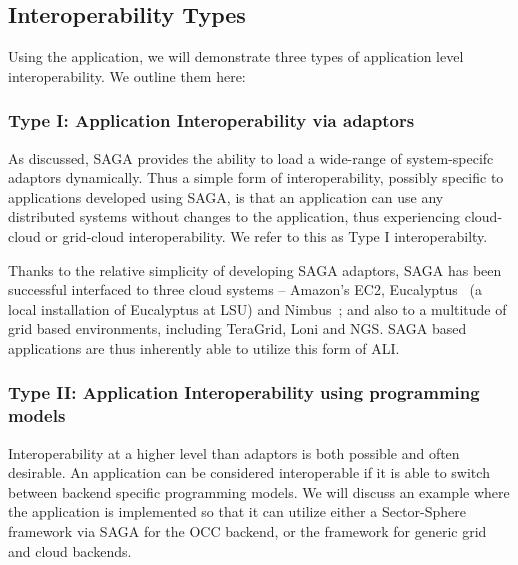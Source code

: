 \documentclass[graybox]{svmult}
\begin{document}
\subsection{Interoperability Types}

Using the \wc application, we will demonstrate three types of
application level interoperability. We outline them here:


\subsubsection{Type I: Application Interoperability via adaptors}
%
%

As discussed, SAGA provides the ability to load a wide-range of
system-specifc adaptors dynamically. Thus a simple form of
interoperability, possibly specific to applications developed using
SAGA, is that an application can use any distributed systems without
changes to the application, thus experiencing cloud-cloud or
grid-cloud interoperability.  We refer to this as Type I
interoperabilty.


Thanks to the relative simplicity of developing SAGA adaptors, SAGA
has been successful interfaced to three cloud systems -- Amazon's EC2,
Eucalyptus~\cite{eucalyptus} (a local installation of Eucalyptus at
LSU) and Nimbus~\cite{nimbus}; and also to a multitude of grid based
environments, including TeraGrid, Loni and NGS.  SAGA based
applications are thus inherently able to utilize this form of ALI.

\subsubsection{Type II: Application Interoperability using programming
  models} %
%
%

Interoperability at a higher level than adaptors is both possible and
often desirable. An application can be considered interoperable if it
is able to switch between backend specific programming models.  We
will discuss an example where the \wc application is implemented so
that it can utilize either a Sector-Sphere framework via SAGA for the
OCC backend, or the \smr framework for generic grid and cloud
backends.
\end{document}
